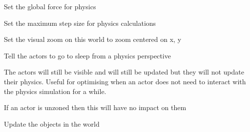 \documentclass[letterpaper,10pt,english]{sphinxmanual}
\begin{document}
\begin{fulllineitems}

\begin{fulllineitems}
\label{world:serge.world.World.setGlobalForce}
Set the global force for physics

\end{fulllineitems}


\begin{fulllineitems}
\label{world:serge.world.World.setPhysicsStepsize}
Set the maximum step size for physics calculations

\end{fulllineitems}


\begin{fulllineitems}
\label{world:serge.world.World.setZoom}
Set the visual zoom on this world to zoom centered on x, y

\end{fulllineitems}


\begin{fulllineitems}
\label{world:serge.world.World.sleepPhysicsForActors}
Tell the actors to go to sleep from a physics perspective

The actors will still be visible and will still be updated but they
will not update their physics. Useful for optimising when an actor
does not need to interact with the physics simulation for a while.

If an actor is unzoned then this will have no impact on them

\end{fulllineitems}


\begin{fulllineitems}
\label{world:serge.world.World.updateWorld}
Update the objects in the world


\end{fulllineitems}
\end{fulllineitems}
\end{document}
